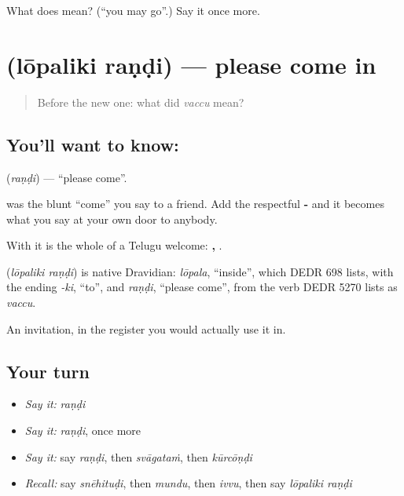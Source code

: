 \begin{tcolorbox}[breakable,colback=teal!4,colframe=teal!35!black,title={Before you move on}]
What does  mean? (\textquotedblleft{}you may go\textquotedblright{}.) Say it once more.
\end{tcolorbox}
\section[\texorpdfstring{\te{లోపలికి} \te{రండి} (lōpaliki raṇḍi)}{లోపలికి రండి (lōpaliki raṇḍi)}]{  (lōpaliki raṇḍi) — please come in}

\label{lesson:TE-C80-comein}



\begin{quote}
Before the new one: what did \emph{vaccu} mean?
\end{quote}

\subsection*{You'll want to know:  }
\textbf{} (\emph{raṇḍi}) — \textquotedblleft{}please come\textquotedblright{}.

 was the blunt \textquotedblleft{}come\textquotedblright{} you say to a friend. Add the respectful \textbf{-} and it becomes what you say at your own door to anybody.

With  it is the whole of a Telugu welcome: \textbf{, }.

\begin{cousinweb}
\textbf{ } (\emph{lōpaliki raṇḍi}) is native Dravidian: \emph{lōpala}, \textquotedblleft{}inside\textquotedblright{}, which DEDR 698 lists, with the ending \emph{-ki}, \textquotedblleft{}to\textquotedblright{}, and \emph{raṇḍi}, \textquotedblleft{}please come\textquotedblright{}, from the verb DEDR 5270 lists as \emph{vaccu}.
\end{cousinweb}

\begin{grammarlens}[title={What you've built}]
An invitation, in the register you would actually use it in.
\end{grammarlens}

\subsection*{Your turn}
\begin{itemize}
\raggedright
  \item \emph{Say it:} \emph{raṇḍi}
  \item \emph{Say it:} \emph{raṇḍi}, once more
  \item \emph{Say it:} say \emph{raṇḍi}, then \emph{svāgataṁ}, then \emph{kūrcōṇḍi}
  \item \emph{Recall:} say \emph{snēhituḍi}, then \emph{mundu}, then \emph{ivvu}, then say \emph{lōpaliki raṇḍi}
\end{itemize}

